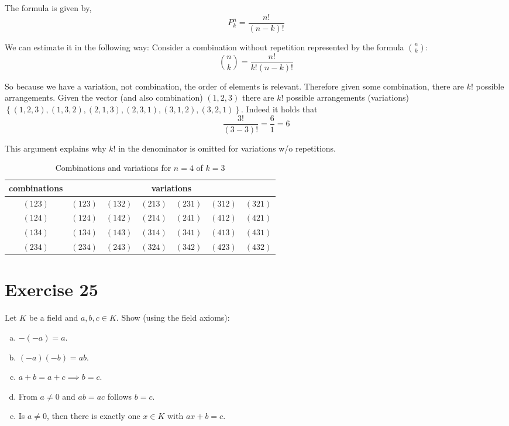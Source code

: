 \documentclass[a4paper]{article}
\theoremstyle{definition}
\newcommand\set[1]{\left\{#1\right\}}
\begin{document}
The formula is given by,
\[ P_k^n = \frac{n!}{(n-k)!} \]

We can estimate it in the following way:
Consider a combination without repetition represented by the formula $n \choose k$:
\[ {n \choose k} = \frac{n!}{k! (n - k)!} \]

So because we have a variation, not combination, the order of elements is relevant.
Therefore given some combination, there are $k!$ possible arrangements. Given the vector
(and also combination) $(1, 2, 3)$ there are $k!$ possible arrangements (variations)
$\set{(1, 2, 3), (1, 3, 2), (2, 1, 3), (2, 3, 1), (3, 1, 2), (3, 2, 1)}$.
Indeed it holds that
\[ \frac{3!}{(3 - 3)!} = \frac61 = 6 \]

This argument explains why $k!$ in the denominator is omitted for variations w/o repetitions.

\begin{table}[!h]
  \begin{center}
    \begin{tabular}{c|cccccc}
      combinations & \multicolumn{6}{c}{variations} \\
    \hline
      $(123)$ & $(123)$ & $(132)$ & $(213)$ & $(231)$ & $(312)$ & $(321)$ \\
      $(124)$ & $(124)$ & $(142)$ & $(214)$ & $(241)$ & $(412)$ & $(421)$ \\
      $(134)$ & $(134)$ & $(143)$ & $(314)$ & $(341)$ & $(413)$ & $(431)$ \\
      $(234)$ & $(234)$ & $(243)$ & $(324)$ & $(342)$ & $(423)$ & $(432)$
    \end{tabular}
    \caption{Combinations and variations for $n=4$ of $k=3$}
  \end{center}
\end{table}

\section{Exercise 25}
\begin{ex}
  Let $K$ be a field and $a,b,c \in K$. Show (using the field axioms):
  \begin{enumerate}[(a)]
    \item $-(-a) = a$.
    \item $(-a)(-b) = ab$.
    \item $a + b = a + c \implies b = c$.
    \item From $a \neq 0$ and $ab = ac$ follows $b = c$.
    \item Is $a \neq 0$, then there is exactly one $x \in K$ with $ax + b = c$.
  \end{enumerate}
\end{ex}
\end{document}
